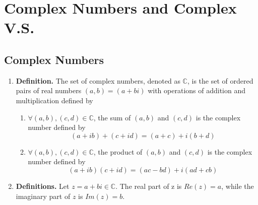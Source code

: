 \documentclass[oneside, 12pt]{book}
\newcommand{\settag}[1]{\renewcommand{\theenumi}{#1}}
\newcommand{\complex}{\mathbb{C}}
\newcommand{\tbf}[1]{\textbf{#1}}
\newcommand{\para}[1]{\item \tbf{#1}}
\begin{document}
\chapter{Complex Numbers and Complex V.S.}
\section{Complex Numbers}
\begin{enumerate}
    \settag{5.1.1}
    \para{Definition.} The set of complex numbers, denoted as $\mathbb{C}$, is the set 
    of ordered pairs of real numbers $(a,b) = (a+bi)$ with operations of addition and 
    multiplication defined by
    \begin{enumerate}
        \item $\forall (a,b), (c,d)\in \mathbb{C}$, the sum of $(a,b)$ and $(c,d)$ is 
        the complex number defined by
        \begin{equation*}
            (a+ib) + (c+id) = (a+c)+i(b+d)
        \end{equation*}
        \item $\forall (a,b),(c,d) \in \mathbb{C}$, the product of $(a,b)$ and $(c,d)$ 
        is the complex number defined by
        \begin{equation*}
            (a+ib)(c+id) = (ac-bd)+i(ad+cb)
        \end{equation*}
    \end{enumerate}
    
    \settag{5.1.2}
    \para{Definitions.} Let $z = a+bi \in \complex$. The real part of z is $Re(z) = a$, 
    while the imaginary part of $z$ is $Im(z) = b$.
    

\end{enumerate}
\end{document}
